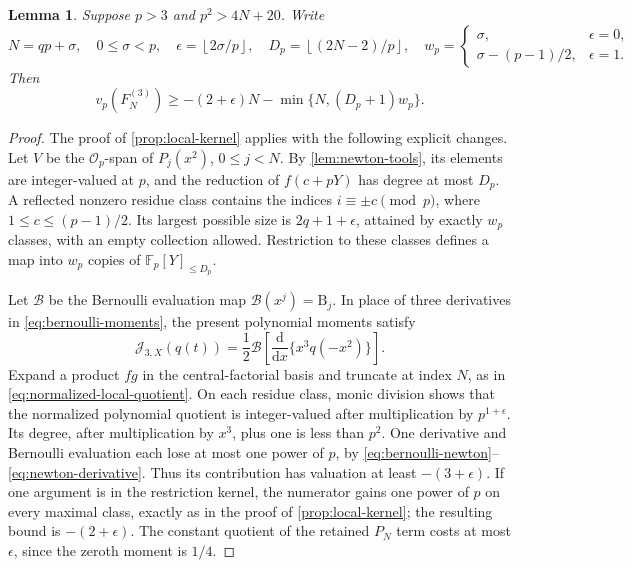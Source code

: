 \documentclass[11pt,letterpaper]{article}
\newtheorem{lemma}[lemma]{Lemma}
\theoremstyle{definition}
\newcommand{\Fp}{\mathbb F_p}
\newcommand{\Bfun}{\mathcal B}
\newcommand{\floor}[1]{\left\lfloor #1\right\rfloor}
\begin{document}
\begin{lemma}\label{lem:z3-local-rank}
Suppose $p>3$ and $p^2>4N+20$. Write
\[
 N=qp+\sigma,\quad 0\le\sigma<p,\quad
 \epsilon=\floor{2\sigma/p},\quad
 D_p=\floor{(2N-2)/p},\quad
 w_p=\begin{cases}
 \sigma,&\epsilon=0,\\
 \sigma-(p-1)/2,&\epsilon=1.
 \end{cases}
\]
Then
\begin{equation}\label{eq:z3-local-rank-bound}
 v_p(F_N^{(3)})\ge
 -(2+\epsilon)N-\min\{N,(D_p+1)w_p\}.
\end{equation}
\end{lemma}
\begin{proof}
The proof of \cref{prop:local-kernel} applies with the following explicit
changes. Let $V$ be the $\mathcal O_p$-span of $P_j(x^2)$, $0\le j<N$.
By \cref{lem:newton-tools}, its elements are integer-valued at $p$, and
the reduction of $f(c+pY)$ has degree at most $D_p$.
A reflected nonzero residue class contains the indices
$i\equiv\pm c\pmod p$, where $1\le c\le(p-1)/2$.
Its largest possible size is $2q+1+\epsilon$, attained by exactly $w_p$
classes, with an empty collection allowed. Restriction to these classes
defines a map into $w_p$ copies of $\Fp[Y]_{\le D_p}$.

Let $\Bfun$ be the Bernoulli evaluation map
$\Bfun(x^j)=\mathrm B_j$. In place of three derivatives in
\eqref{eq:bernoulli-moments}, the present polynomial moments satisfy
\begin{equation}\label{eq:z3-bernoulli-functional}
 \mathcal J_{3,X}(q(t))
 =\frac12\Bfun\left[\frac{\mathrm d}{\mathrm d x}
       \{x^3q(-x^2)\}\right].
\end{equation}
Expand a product $fg$ in the central-factorial basis and truncate at
index $N$, as in \eqref{eq:normalized-local-quotient}. On each residue
class, monic division shows that the normalized polynomial quotient is
integer-valued after multiplication by $p^{1+\epsilon}$. Its degree,
after multiplication by $x^3$, plus one is less than $p^2$.
One derivative and Bernoulli evaluation each lose at most one power
of $p$, by \eqref{eq:bernoulli-newton}--\eqref{eq:newton-derivative}.
Thus its contribution has valuation at least $-(3+\epsilon)$.
If one argument is in the restriction kernel, the numerator gains one
power of $p$ on every maximal class, exactly as in the proof of
\cref{prop:local-kernel}; the resulting bound is $-(2+\epsilon)$.
The constant quotient of the retained $P_N$ term costs at most
$\epsilon$, since the zeroth moment is $1/4$.


\end{proof}
\end{document}
